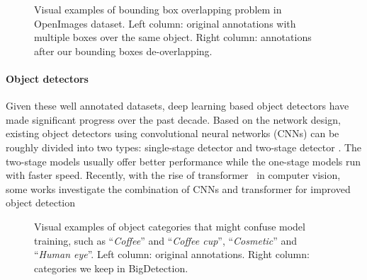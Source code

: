 \documentclass[10pt,twocolumn,letterpaper]{article}
\begin{document}
\begin{figure}[t]
    \centering
    
    
    \caption{Visual examples of bounding box overlapping problem in OpenImages dataset. Left column: original annotations with multiple boxes over the same object. Right column: annotations after our bounding boxes de-overlapping.}
    \label{fig:bbox_overlap}
\end{figure} \paragraph{Object detectors}
Given these well annotated datasets, deep learning based object detectors have made significant progress over the past decade.
Based on the network design, existing object detectors using convolutional neural networks (CNNs) can be roughly divided into two types: single-stage detector \cite{liu2016ssd,fu2017dssd,li2017fssd, redmon2016you, redmon2017yolo9000, farhadi2018yolov3, bochkovskiy2020yolov4, tian2019fcos, law2018cornernet, zhou2019objects} and two-stage detector \cite{girshick2014rich,girshick2015fast,ren2015faster, cai2018cascade, zhou2021probabilistic}. The two-stage models usually offer better performance while the one-stage models run with faster speed.
Recently, with the rise of transformer~\cite{vaswani2017attention, dosovitskiy2020image} in computer vision, some works investigate the combination of CNNs and transformer for improved object detection~\cite{carion2020end,zhu2020deformable,dai2021up,beal2020toward,sun2021rethinking,zheng2020end,wang_2021_pct}
\vspace{-1ex}

 
\begin{figure}[t]
    \centering
    
    
    \caption{Visual examples of  object categories that might confuse model training, such as ``\textit{Coffee}'' and ``\textit{Coffee cup}'', ``\textit{Cosmetic}'' and ``\textit{Human eye}''. Left column: original annotations. Right column: categories we keep in BigDetection.}
    \label{fig:invalid}
\end{figure} 
\end{document}
